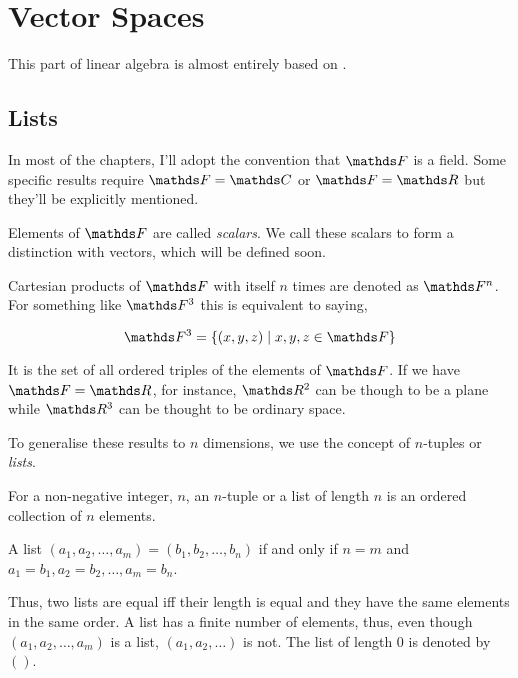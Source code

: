 \chapter{Vector Spaces}

This part of linear algebra is almost entirely based on \cite{axlerlin}.

\section{Lists}

In most of the chapters, I'll adopt the convention that \(\FF\) is a field. Some specific results require \(\FF = \CC\) or \(\FF = \RR\)
but they'll be explicitly mentioned.


Elements of \(\FF\) are called \emph{scalars}. We call these scalars to form a distinction with vectors, which will be defined soon.

Cartesian products of \(\FF\) with itself \(n\) times are denoted as \(\FF^{n}\). For something like
\(\FF^3\) this is equivalent to saying,

\[
    \FF^{3} = \left\{(x, y, z) \mid x, y, z \in \FF\right\}
\]

It is the set of all ordered triples of the elements of \(\FF\). If we have \(\FF = \RR\),
for instance, \(\RR^2\) can be though to be a plane while \(\RR^3\) can be thought to be ordinary space.

To generalise these results to \(n\) dimensions, we use the concept of \(n\)-tuples or \emph{lists}.

 


\begin{definition}[Lists]
    For a non-negative integer, \(n\), an \(n\)-tuple or a list of length \(n\) is an ordered collection of \(n\) elements.
    
    A list \((a_1, a_2, \dots, a_m) = (b_1, b_2, \dots, b_n)\) if and only if \(n = m\) and \(a_1 = b_1, a_2 = b_2, \dots,
    a_m = b_n\).
\end{definition}

Thus, two lists are equal iff their length is equal and they have the same elements in the same order.
A list has a finite number of elements, thus, even though \((a_1, a_2, \dots, a_m)\) is a list, \((a_1, a_2, \dots)\) is not.
The list of length \(0\) is denoted by \(()\). 


